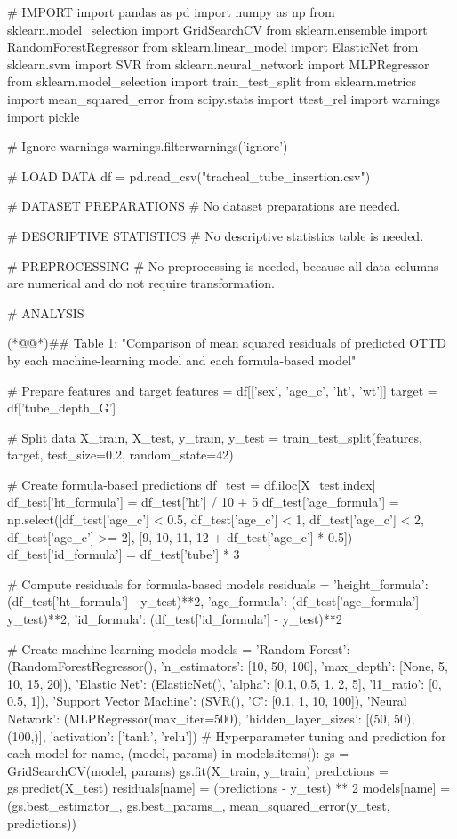 \documentclass[11pt]{article}
\begin{document}
\begin{python}

# IMPORT
import pandas as pd
import numpy as np
from sklearn.model_selection import GridSearchCV
from sklearn.ensemble import RandomForestRegressor
from sklearn.linear_model import ElasticNet
from sklearn.svm import SVR
from sklearn.neural_network import MLPRegressor
from sklearn.model_selection import train_test_split
from sklearn.metrics import mean_squared_error
from scipy.stats import ttest_rel
import warnings
import pickle


# Ignore warnings
warnings.filterwarnings('ignore')

# LOAD DATA
df = pd.read_csv("tracheal_tube_insertion.csv")

# DATASET PREPARATIONS
# No dataset preparations are needed.

# DESCRIPTIVE STATISTICS
# No descriptive statistics table is needed.

# PREPROCESSING
# No preprocessing is needed, because all data columns are numerical and do not require transformation.

# ANALYSIS

(*@@*)## Table 1: "Comparison of mean squared residuals of predicted OTTD by each machine-learning model and each formula-based model"

# Prepare features and target
features = df[['sex', 'age_c', 'ht', 'wt']]
target = df['tube_depth_G']

# Split data
X_train, X_test, y_train, y_test = train_test_split(features, target, test_size=0.2, random_state=42)

# Create formula-based predictions
df_test = df.iloc[X_test.index]
df_test['ht_formula'] = df_test['ht'] / 10 + 5
df_test['age_formula'] = np.select([df_test['age_c'] < 0.5, df_test['age_c'] < 1, df_test['age_c'] < 2, df_test['age_c'] >= 2],
                                   [9, 10, 11, 12 + df_test['age_c'] * 0.5])
df_test['id_formula'] = df_test['tube'] * 3

# Compute residuals for formula-based models
residuals = {'height_formula': (df_test['ht_formula'] - y_test)**2,
             'age_formula': (df_test['age_formula'] - y_test)**2,
             'id_formula': (df_test['id_formula'] - y_test)**2}

# Create machine learning models
models = {'Random Forest': (RandomForestRegressor(), {'n_estimators': [10, 50, 100], 'max_depth': [None, 5, 10, 15, 20]}),
          'Elastic Net': (ElasticNet(), {'alpha': [0.1, 0.5, 1, 2, 5], 'l1_ratio': [0, 0.5, 1]}),
          'Support Vector Machine': (SVR(), {'C': [0.1, 1, 10, 100]}),
          'Neural Network': (MLPRegressor(max_iter=500), {'hidden_layer_sizes': [(50, 50), (100,)], 'activation': ['tanh', 'relu']})
          }
# Hyperparameter tuning and prediction for each model
for name, (model, params) in models.items():
    gs = GridSearchCV(model, params)
    gs.fit(X_train, y_train)
    predictions = gs.predict(X_test)
    residuals[name] = (predictions - y_test) ** 2
    models[name] = (gs.best_estimator_, gs.best_params_, mean_squared_error(y_test, predictions))


\end{python}
\end{document}
